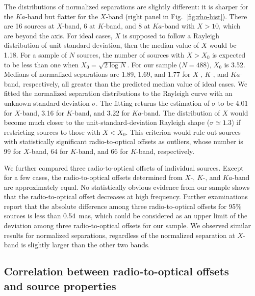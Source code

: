 \documentclass{aa}
\begin{document}
    The distributions of normalized separations are slightly different: it is sharper for the $Ka$-band but flatter for the $X$-band (right panel in Fig.~\ref{fig:rho-hist}).
    There are 16 sources at $X$-band, 6 at $K$-band, and 8 at $Ka$-band with $X>10$, which are beyond the axis.
    For ideal cases, $X$ is supposed to follow a Rayleigh distribution of unit standard deviation, then the median value of $X$ would be 1.18.
    For a sample of $N$ sources, the number of sources with $X>X_0$ is expected to be less than one when $X_0=\sqrt{2\log{N}}$.
    For our sample ($N=488$), $X_0$ is 3.52.
    Medians of normalized separations are 1.89, 1.69, and 1.77 for $X$-, $K$-, and $Ka$-band, respectively, all greater than the predicted median value of ideal cases.
    We fitted the normalized separation distributions to the Rayleigh curve with an unknown standard deviation $\sigma$.
    The fitting returns the estimation of $\sigma$ to be 4.01 for $X$-band, 3.16 for $K$-band, and 3.22 for $Ka$-band.
    The distribution of $X$ would become much closer to the unit-standard-deviation Rayleigh shape ($\sigma \simeq 1.3$) if restricting sources to those with $X<X_0$.
    This criterion would rule out sources with statistically significant radio-to-optical offsets as outliers, whose number is 99 for $X$-band, 64 for $K$-band, and 66 for $K$-band, respectively.

    We further compared three radio-to-optical offsets of individual sources. %
    Except for a few cases, the radio-to-optical offsets determined from $X$-, $K$-, and $Ka$-band are approximately equal.
    No statistically obvious evidence from our sample shows that the radio-to-optical offset decreases at high frequency.
    Further examinations report that the absolute difference among three radio-to-optical offsets for 95\% sources is less than 0.54~mas, which could be considered as an upper limit of the deviation among three radio-to-optical offsets for our sample.
    We observed similar results for normalized separations, regardless of the normalized separation at $X$-band is slightly larger than the other two bands.

\subsection{Correlation between radio-to-optical offsets and source properties}    \label{subsec:r2o-corr}
\end{document}
